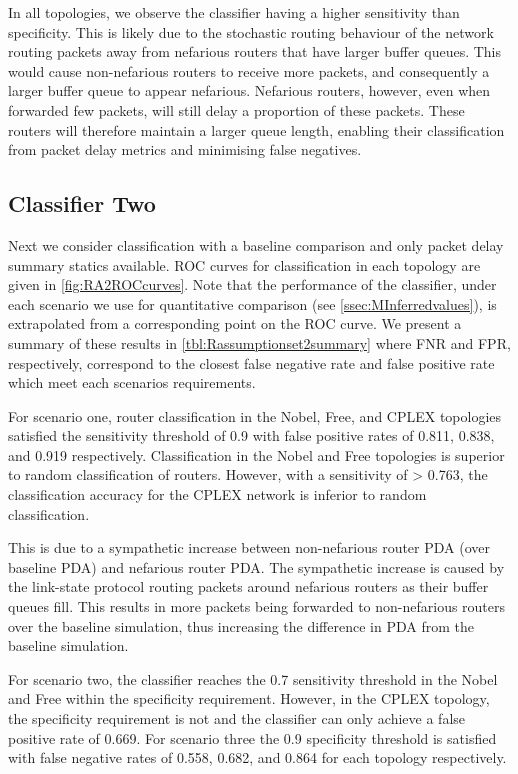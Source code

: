 In all topologies, we observe the classifier having a higher sensitivity than specificity. This is likely due to the stochastic routing behaviour of the network routing packets away from nefarious routers that have larger buffer queues. This would cause non-nefarious routers to receive more packets, and consequently a larger buffer queue to appear nefarious. Nefarious routers, however, even when forwarded few packets, will still delay a proportion of these packets. These routers will therefore maintain a larger queue length, enabling their classification from packet delay metrics and minimising false negatives.\par

\subsection{Classifier Two}
\label{ssec:Ras2}
Next we consider classification with a baseline comparison and only packet delay summary statics available. ROC curves for classification in each topology are given in \cref{fig:RA2ROCcurves}. Note that the performance of the classifier, under each scenario we use for quantitative comparison (see \cref{ssec:MInferredvalues}), is extrapolated from a corresponding point on the ROC curve. We present a summary of these results in \cref{tbl:Rassumptionset2summary} where FNR and FPR, respectively, correspond to the closest false negative rate and false positive rate which meet each scenarios requirements.\par
For scenario one, router classification in the Nobel, Free, and CPLEX topologies satisfied the sensitivity threshold of 0.9 with false positive rates of 0.811, 0.838, and 0.919 respectively. Classification in the Nobel and Free topologies is superior to random classification of routers. However, with a sensitivity of > 0.763, the classification accuracy for the CPLEX network is inferior to random classification.\par This is due to a sympathetic increase between non-nefarious router PDA (over baseline PDA) and nefarious router PDA. The sympathetic increase is caused by the link-state protocol routing packets around nefarious routers as their buffer queues fill. This results in more packets being forwarded to non-nefarious routers over the baseline simulation, thus increasing the difference in PDA from the baseline simulation.\par
For scenario two, the classifier reaches the 0.7 sensitivity threshold in the Nobel and Free within the specificity requirement. However, in the CPLEX topology, the specificity requirement is not and the classifier can only achieve a false positive rate of 0.669. For scenario three the 0.9 specificity threshold is satisfied with false negative rates of 0.558, 0.682, and 0.864 for each topology respectively.\par
